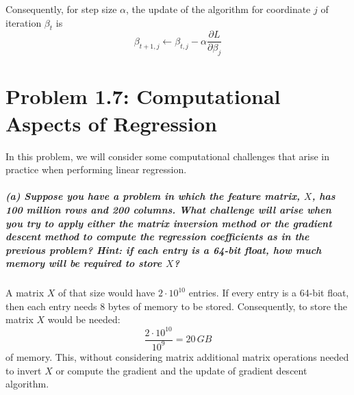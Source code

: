 \documentclass[11pt, english]{article}
\begin{document}
Consequently, for step size \(\alpha\), the update of the algorithm for
coordinate \(j\) of iteration \(\beta_t\) is
\[\beta_{t+1,j} \leftarrow \beta_{t,j} - \alpha \frac{\partial L}{\partial \beta_j}\]

    \hypertarget{problem-1.7-computational-aspects-of-regression}{%
\section*{\texorpdfstring{\textbf{Problem 1.7:} Computational Aspects
of
Regression}{Problem 1.7: Computational Aspects of Regression}}\label{problem-1.7-computational-aspects-of-regression}}

In this problem, we will consider some computational challenges that
arise in practice when performing linear regression.

    \hypertarget{a-suppose-you-have-a-problem-in-which-the-feature-matrix-x-has-100-million-rows-and-200-columns.-what-challenge-will-arise-when-you-try-to-apply-either-the-matrix-inversion-method-or-the-gradient-descent-method-to-compute-the-regression-coefficients-as-in-the-previous-problem-hint-if-each-entry-is-a-64-bit-float-how-much-memory-will-be-required-to-store-x}{%
\subparagraph{\texorpdfstring{(a) Suppose you have a problem in which
the feature matrix, \(X\), has 100 million rows and 200 columns. What
challenge will arise when you try to apply either the matrix inversion
method or the gradient descent method to compute the regression
coefficients as in the previous problem? \emph{Hint: if each entry is a
64-bit float, how much memory will be required to store
\(X\)?\\[2ex]}}{(a) Suppose you have a problem in which the feature matrix, X, has 100 million rows and 200 columns. What challenge will arise when you try to apply either the matrix inversion method or the gradient descent method to compute the regression coefficients as in the previous problem? Hint: if each entry is a 64-bit float, how much memory will be required to store X?}}\label{a-suppose-you-have-a-problem-in-which-the-feature-matrix-x-has-100-million-rows-and-200-columns.-what-challenge-will-arise-when-you-try-to-apply-either-the-matrix-inversion-method-or-the-gradient-descent-method-to-compute-the-regression-coefficients-as-in-the-previous-problem-hint-if-each-entry-is-a-64-bit-float-how-much-memory-will-be-required-to-store-x}}

    A matrix \(X\) of that size would have \(2 \cdot 10^{10}\) entries. If
every entry is a 64-bit float, then each entry needs 8 bytes of memory
to be stored. Consequently, to store the matrix \(X\) would be needed:
\[ \frac{2 \cdot 10^{10}}{10^{9}} = 20\, GB\] of memory. This, without
considering matrix additional matrix operations needed to invert \(X\)
or compute the gradient and the update of gradient descent algorithm.
\end{document}
